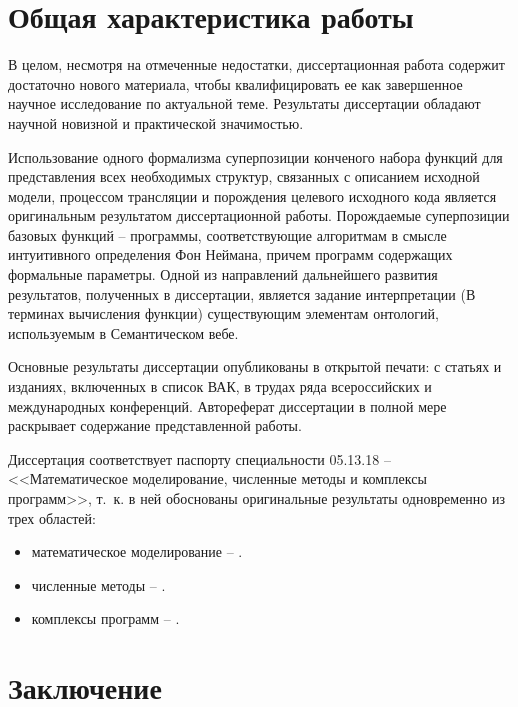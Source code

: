 \documentclass[14pt]{extarticle}
\begin{document}
\section{Общая характеристика работы}

В целом, несмотря на отмеченные недостатки, диссертационная работа содержит достаточно нового материала, чтобы квалифицировать ее как завершенное научное исследование по актуальной теме.  Результаты диссертации обладают научной новизной и практической значимостью.

Использование одного формализма суперпозиции конченого набора функций для представления всех необходимых структур, связанных с описанием исходной модели, процессом трансляции и порождения целевого исходного кода является оригинальным результатом диссертационной работы.  Порождаемые суперпозиции базовых функций -- программы, соответствующие алгоритмам в смысле интуитивного определения Фон Неймана, причем программ содержащих формальные параметры.  Одной из направлений дальнейшего развития результатов, полученных в диссертации, является задание интерпретации (В терминах вычисления функции) существующим элементам онтологий, используемым в Семантическом вебе.

Основные результаты диссертации опубликованы в открытой печати: с статьях и изданиях, включенных в список ВАК, в трудах ряда всероссийских и международных конференций. Автореферат диссертации в полной мере раскрывает содержание представленной работы.

Диссертация соответствует паспорту специальности 05.13.18 -- <<Математическое моделирование, численные методы и комплексы программ>>, т.~к. в ней обоснованы оригинальные результаты одновременно из трех областей:
\begin{itemize}
\item математическое моделирование -- .

\item численные методы -- .

\item комплексы программ -- .
\end{itemize}

\section{Заключение}
\label{sec-conc}

\end{document}
